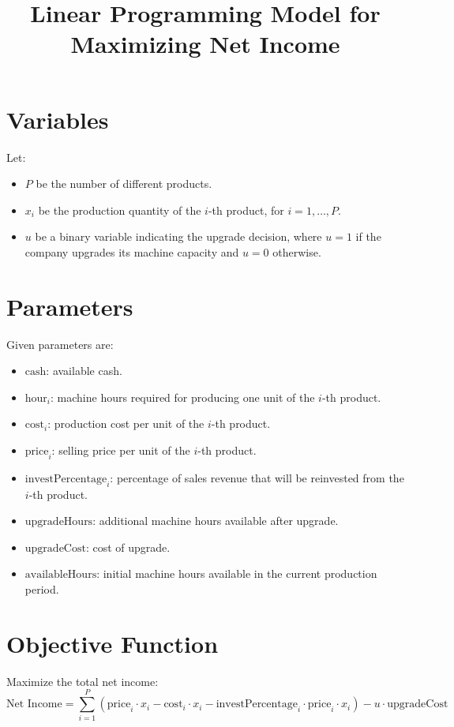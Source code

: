 \documentclass{article}
\begin{document}
\title{Linear Programming Model for Maximizing Net Income}
\author{}
\date{}
\maketitle

\section*{Variables}
Let:
\begin{itemize}
    \item \( P \) be the number of different products.
    \item \( x_i \) be the production quantity of the \( i \)-th product, for \( i = 1, \ldots, P \).
    \item \( u \) be a binary variable indicating the upgrade decision, where \( u = 1 \) if the company upgrades its machine capacity and \( u = 0 \) otherwise.
\end{itemize}

\section*{Parameters}
Given parameters are:
\begin{itemize}
    \item \( \text{cash} \): available cash.
    \item \( \text{hour}_i \): machine hours required for producing one unit of the \( i \)-th product.
    \item \( \text{cost}_i \): production cost per unit of the \( i \)-th product.
    \item \( \text{price}_i \): selling price per unit of the \( i \)-th product.
    \item \( \text{investPercentage}_i \): percentage of sales revenue that will be reinvested from the \( i \)-th product.
    \item \( \text{upgradeHours} \): additional machine hours available after upgrade.
    \item \( \text{upgradeCost} \): cost of upgrade.
    \item \( \text{availableHours} \): initial machine hours available in the current production period.
\end{itemize}

\section*{Objective Function}
Maximize the total net income:
\[
\text{Net Income} = \sum_{i=1}^{P} \left( \text{price}_i \cdot x_i - \text{cost}_i \cdot x_i - \text{investPercentage}_i \cdot \text{price}_i \cdot x_i \right) - u \cdot \text{upgradeCost}
\]
\end{document}
